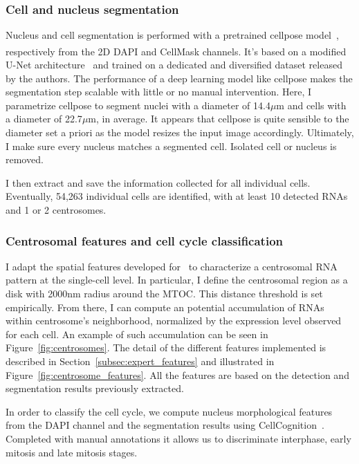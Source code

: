 \subsubsection{Cell and nucleus segmentation}

Nucleus and cell segmentation is performed with a pretrained cellpose model~\cite{stringer_cellpose_2021}, respectively from the 2D DAPI and CellMask\textsuperscript{\texttrademark} channels.
It's based on a modified U-Net architecture~\cite{Ronneberger_unet} and trained on a dedicated and diversified dataset released by the authors.
The performance of a deep learning model like cellpose makes the segmentation step scalable with little or no manual intervention.
Here, I parametrize cellpose to segment nuclei with a diameter of 14.4$\mu$m and cells with a diameter of 22.7$\mu$m, in average.
It appears that cellpose is quite sensible to the diameter set a priori as the model resizes the input image accordingly.
Ultimately, I make sure every nucleus matches a segmented cell.
Isolated cell or nucleus is removed.

I then extract and save the information collected for all individual cells.
Eventually, 54,263 individual cells are identified, with at least 10 detected \ac{RNA}s and 1 or 2 centrosomes.

\subsubsection{Centrosomal features and cell cycle classification}

I adapt the spatial features developed for~\cite{CHOUAIB_2020} to characterize a centrosomal \ac{RNA} pattern at the single-cell level.
In particular, I define the centrosomal region as a disk with 2000nm radius around the \ac{MTOC}.
This distance threshold is set empirically.
From there, I can compute an potential accumulation of \ac{RNA}s within centrosome's neighborhood, normalized by the expression level observed for each cell.
An example of such accumulation can be seen in Figure~\ref{fig:centrosomes}.
The detail of the different features implemented is described in Section~\ref{subsec:expert_features} and illustrated in Figure~\ref{fig:centrosome_features}.
All the features are based on the detection and segmentation results previously extracted.

In order to classify the cell cycle, we compute nucleus morphological features from the DAPI channel and the segmentation results using CellCognition~\cite{held_cellcognition_2010}.
Completed with manual annotations it allows us to discriminate interphase, early mitosis and late mitosis stages.

